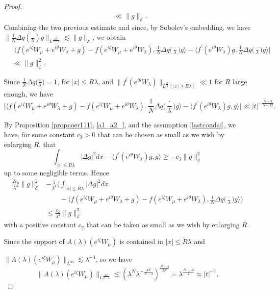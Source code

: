 \documentclass[10pt,a4paper]{amsart}
\begin{document}
\begin{proof}
\begin{align*}
&\ll \|g\|_{\mathcal{E}}.
\end{align*}
Combining the two previous estimate and since, by Sobolev's embedding, we have $\|\frac{1}{N} \Delta q (\frac{.}{\lambda}) g \|_{L^{\frac{2N}{N-4}}} \lesssim \|g\|_{\mathcal{E}}$, we obtain
\begin{align*}
&\big|\big\langle f(e^{i\zeta}W_\mu +e^{i\theta} W_\lambda +g) - f(e^{i\zeta}W_\mu +e^{i\theta} W_\lambda) , \frac{1}{N}\Delta q \big(\frac{\cdot}{\lambda}\big) g  \big\rangle - \big\langle f^\prime (e^{i\theta}W_\lambda)g , \frac{1}{N}\Delta q \big(\frac{\cdot}{\lambda}\big) g \big\rangle\big|\\
& \ll %
\|g\|_{\mathcal{E}}^2 . 
\end{align*}

Since $\frac{1}{N}\Delta q \big(\frac{x}{\lambda}\big)=1$, for $|x|\leq R \lambda$, and $\|f^\prime (e^{i\theta} W_\lambda)\|_{L^{\frac{N}{4}} (|x|\geq R\lambda)} \ll 1$ for $R$ large enough, we have
$$\big|\big\langle f(e^{i\zeta}W_\mu +e^{i\theta} W_\lambda +g) - f(e^{i\zeta}W_\mu +e^{i\theta} W_\lambda) , \frac{1}{N}\Delta q \big(\frac{\cdot}{\lambda}\big) g  \big\rangle - \langle f^\prime (e^{i\theta}W_\lambda)g ,  g \rangle\big| \ll  |t|^{-\frac{N-3}{N-12}}.$$

By Proposition \ref{propcoer111}, \eqref{a1_a2_}, and the assumption \eqref{lastcondai}, we have, for some constant $c_3>0$ that can be chosen as small as we wish by enlarging $R$, that
$$\int_{|x|\leq R\lambda} |\Delta g|^2 dx - \langle f^\prime (e^{i\theta } W_\lambda) g ,g\rangle \geq - c_3 \|g\|_{\mathcal{E}}^2 $$
 up to some negligible terms.
Hence
\begin{align*}
\frac{2c_0}{\lambda^4} \|g\|_{\mathcal{E}}^2 & - \frac{1}{\lambda^4} \Big(\int_{|x|\leq R\lambda} |\Delta g|^2 dx \\
&\qquad -\big\langle f (e^{i\zeta}W_\mu +e^{i\theta} W_\lambda +g) - f (e^{i\zeta} W_\mu +e^{i\theta} W_\lambda ) , \frac{1}{N} \Delta q \big(\frac{\cdot}{\lambda} \big) g\big\rangle  \Big) \\
& \leq \frac{c_2}{\lambda^4} \|g\|_{\mathcal{E}}^2
\end{align*}
with a positive constant $c_2$ that can be taken as small as we wish by enlarging $R$.

Since the support of $A(\lambda)(e^{i\zeta} W_\mu)$ is contained in $|x|\leq \tilde{R} \lambda$ and 

$\|A(\lambda)(e^{i\zeta} W_\mu)\|_{L^\infty}\lesssim \lambda^{-4}$, so we have
$$\|A(\lambda)(e^{i\zeta} W_\mu)\|_{L^{\frac{2N}{N-4}}} \lesssim (\lambda^N \lambda^{-\frac{4N}{N-4} } )^{\frac{N-4}{2N}}=\lambda^{\frac{N-12}{2}}\approx |t|^{-1}.  $$


\end{proof}
\end{document}
